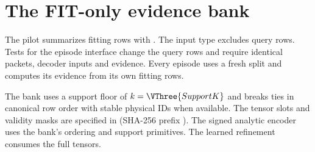 \section{The FIT-only evidence bank}\label{app:evidence}

The pilot summarizes fitting rows with . The input type excludes query rows. Tests for the episode interface change the query rows and require identical packets, decoder inputs and evidence. Every episode uses a fresh split and computes its evidence from its own fitting rows.

The bank uses a support floor of $k=\VThree{SupportK}$ and breaks ties in canonical row order with stable physical IDs when available. The tensor slots and validity masks are specified in  (SHA-256 prefix \texttt{}). The signed analytic encoder uses the bank's ordering and support primitives. The learned refinement consumes the full tensors.
